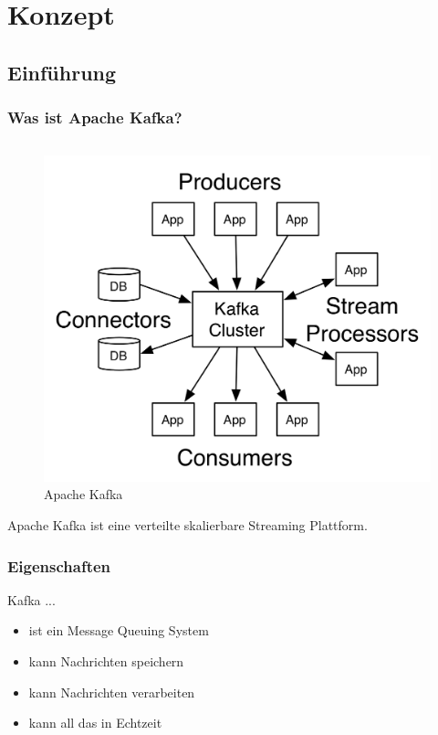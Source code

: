 \section{Konzept}
\subsection{Einführung}
\begin{frame}
\frametitle{Was ist Apache Kafka?}
\begin{columns}[T]
	\begin{column}[T]{0.49\textwidth}
		
	\end{column}
	\begin{column}[T]{0.49\textwidth}
		
\end{column}
\end{columns}

\centering
\begin{figure}[h]
	\includegraphics[scale=1.0]{figure/kafka-apis.png}
	\caption{Apache Kafka~\cite{Kafka}}
\end{figure}

Apache Kafka ist eine verteilte skalierbare Streaming Plattform.

\end{frame}


\begin{frame}
\frametitle{Eigenschaften}
Kafka ...
\begin{itemize}
	\item ist ein Message Queuing System
	\item kann Nachrichten speichern
	\item kann Nachrichten verarbeiten
	\item kann all das in Echtzeit
\end{itemize}

\end{frame}


